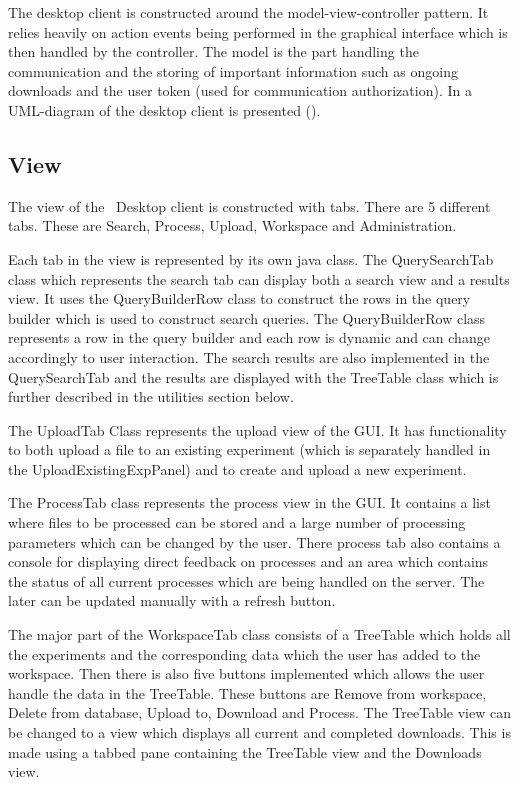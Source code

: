 The desktop client is constructed around the model-view-controller pattern. It
relies heavily on action events being performed in the graphical interface which
is then handled by the controller. The model is the part handling the
communication and the storing of important information such as ongoing downloads
and the user token (used for communication authorization). In
 a UML-diagram of the desktop client is presented (). 

\subsection{View}
The view of the \appName\ Desktop client is constructed with tabs. There are 5 different tabs. These are Search, Process, Upload, Workspace and Administration.

Each tab in the view is represented by its own java class. The QuerySearchTab class which represents the search tab can display both a search view and a results view. It uses the QueryBuilderRow class to construct the rows in the query builder which is used to construct search queries. The QueryBuilderRow class represents a row in the query builder and each row is dynamic and can change accordingly to user interaction. The search results are also implemented in the QuerySearchTab and the results are displayed with the TreeTable class which is further described in the utilities section below.

The UploadTab Class represents the upload view of the GUI. It has functionality to both upload a file to an existing experiment (which is separately handled in the UploadExistingExpPanel) and to create and upload a new experiment.

The ProcessTab class represents the process view in the GUI. It contains a list where files to be processed can be stored and a large number of processing parameters which can be changed by the user. There process tab also contains a console for displaying direct feedback on processes and an area which contains the status of all current processes which are being handled on the server. The later can be updated manually with a refresh button.

The major part of the WorkspaceTab class consists of a TreeTable which holds all the experiments and the corresponding data which the user has added to the workspace. Then there is also five buttons implemented which allows the user handle the data in the TreeTable. These buttons are Remove from workspace, Delete from database, Upload to, Download and Process. The TreeTable view can be changed to a view which displays all current and completed downloads. This is made using a tabbed pane containing the TreeTable view and the Downloads view.

